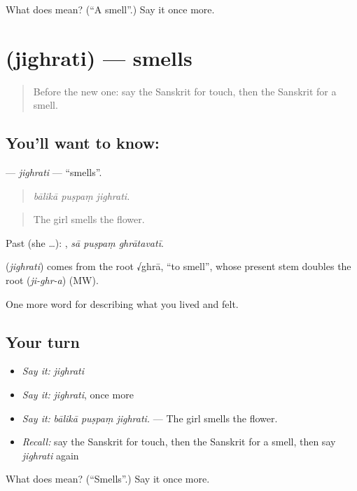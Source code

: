 \begin{tcolorbox}[breakable,colback=teal!4,colframe=teal!35!black,title={Before you move on}]
What does  mean? (\textquotedblleft{}A smell\textquotedblright{}.) Say it once more.
\end{tcolorbox}
\section[\texorpdfstring{\sk{जिघ्रति} (jighrati)}{जिघ्रति (jighrati)}]{ (jighrati) — smells}

\label{lesson:SA-C469-jighrati}



\begin{quote}
Before the new one: say the Sanskrit for touch, then the Sanskrit for a smell.
\end{quote}

\subsection*{You'll want to know: }
\textbf{} — \emph{jighrati} — \textquotedblleft{}smells\textquotedblright{}.

\begin{quote}
  
\end{quote}

\begin{quote}
\emph{bālikā puṣpaṃ jighrati.}
\end{quote}

\begin{quote}
The girl smells the flower.
\end{quote}

Past (she …):   , \emph{sā puṣpaṃ ghrātavatī}.

\begin{cousinweb}
\textbf{} (\emph{jighrati}) comes from the root √ghrā, \textquotedblleft{}to smell\textquotedblright{}, whose present stem doubles the root (\emph{ji-ghr-a}) (MW).
\end{cousinweb}

\begin{grammarlens}[title={What you've built}]
One more word for describing what you lived and felt.
\end{grammarlens}

\subsection*{Your turn}
\begin{itemize}
\raggedright
  \item \emph{Say it:} \emph{jighrati}
  \item \emph{Say it:} \emph{jighrati}, once more
  \item \emph{Say it:} \emph{bālikā puṣpaṃ jighrati.} — The girl smells the flower.
  \item \emph{Recall:} say the Sanskrit for touch, then the Sanskrit for a smell, then say \emph{jighrati} again
\end{itemize}

\begin{tcolorbox}[breakable,colback=teal!4,colframe=teal!35!black,title={Before you move on}]
What does  mean? (\textquotedblleft{}Smells\textquotedblright{}.) Say it once more.
\end{tcolorbox}
